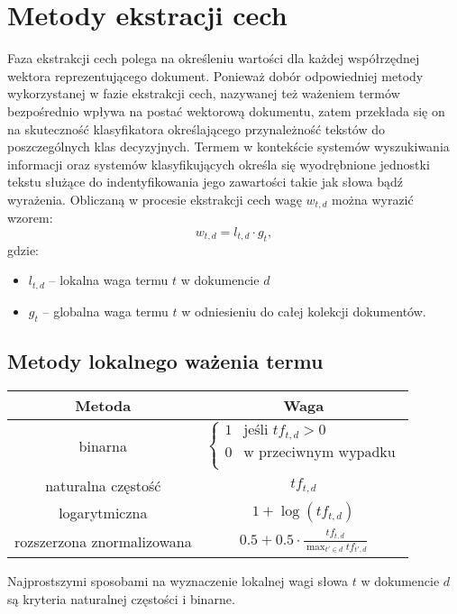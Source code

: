 \documentclass{pracamgr}
\begin{document}
\section{Metody ekstracji cech}

Faza ekstrakcji cech polega na określeniu wartości dla każdej współrzędnej wektora reprezentującego dokument. Ponieważ dobór odpowiedniej metody wykorzystanej w fazie ekstrakcji cech, nazywanej też ważeniem termów bezpośrednio wpływa na postać wektorową dokumentu, zatem przekłada się on na skuteczność klasyfikatora określającego przynależność tekstów do poszczególnych klas decyzyjnych. Termem w kontekście systemów wyszukiwania informacji oraz systemów klasyfikujących określa się wyodrębnione jednostki tekstu służące do indentyfikowania jego zawartości takie jak słowa bądź wyrażenia. Obliczaną w procesie ekstrakcji cech wagę $w_{t,d}$ można wyrazić wzorem:
\[
w_{t,d} = l_{t,d} \cdot g_{t},
\]
gdzie:
\begin{itemize}
    \item $l_{t,d}$ – lokalna waga termu $t$ w dokumencie $d$
    \item $g_{t}$ – globalna waga termu $t$ w odniesieniu do całej kolekcji dokumentów.
\end{itemize}

\subsection{Metody lokalnego ważenia termu}
\vspace{3mm}

\begin{tabular}{|c|c|}
     Metoda & Waga \\ \hline
     binarna & $ \begin{cases} 1 & \text{jeśli } tf_{t,d} > 0 \\ 0 & \text{w przeciwnym wypadku} \\ \end{cases} $ \\[0.25cm] 
     naturalna częstość & $ tf_{t,d} $ \\[0.25cm] 
     logarytmiczna & $ 1 + \log(tf_{t,d}) $ \\[0.25cm] 
     rozszerzona znormalizowana & $ 0.5 + 0.5 \cdot \displaystyle\frac{tf_{t,d}}{\displaystyle\max_{t' \in d} tf_{t',d}} $ \\
\end{tabular}
\vspace{5mm}

Najprostszymi sposobami na wyznaczenie lokalnej wagi słowa $t$ w dokumencie $d$ są kryteria naturalnej częstości i binarne.
\end{document}
